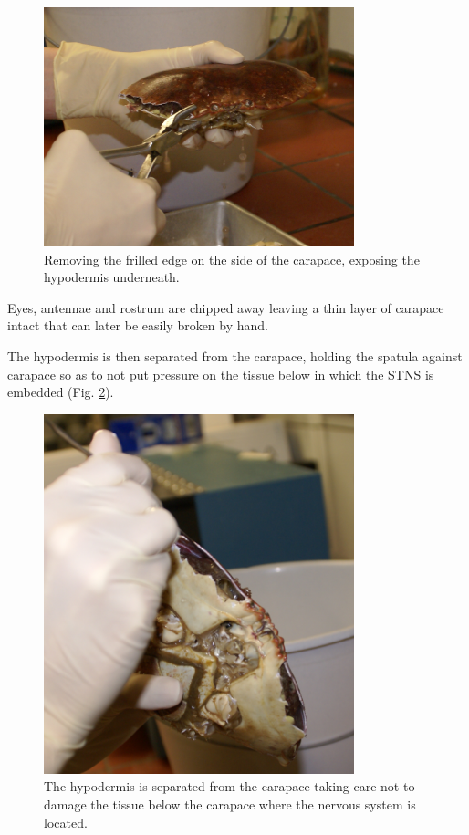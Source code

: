 \begin{figure}[H]
	\begin{center}
		\includegraphics[width=9cm]{graphics/dissection_crab3.png}
		\caption{Removing the frilled edge on the side of the carapace, exposing the hypodermis underneath.}
		\label{fig:dissection_crab3}
	\end{center}
\end{figure}

Eyes, antennae and rostrum are chipped away leaving a thin layer of carapace intact that can later be easily broken by hand. 

The hypodermis is then separated from the carapace, holding the spatula against carapace so as to not put pressure on the tissue below in which the \ac{STNS} is embedded (Fig. \ref{fig:dissection_crab4}).

\begin{figure}[H]
	\begin{center}
		\includegraphics[width=9cm]{graphics/dissection_crab4.png}
		\caption{The hypodermis is separated from the carapace taking care not to damage the tissue below the carapace where the nervous system is located.}
		\label{fig:dissection_crab4}
	\end{center}
\end{figure}

